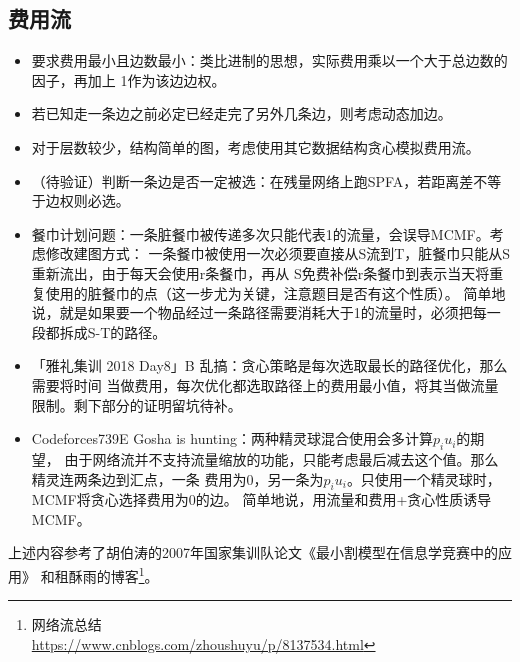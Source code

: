 \subsection{费用流}
\begin{itemize}
    \item 要求费用最小且边数最小：类比进制的思想，实际费用乘以一个大于总边数的因子，再加上
    1作为该边边权。
    \item 若已知走一条边之前必定已经走完了另外几条边，则考虑动态加边。
    \item 对于层数较少，结构简单的图，考虑使用其它数据结构贪心模拟费用流。
    \item （待验证）判断一条边是否一定被选：在残量网络上跑SPFA，若距离差不等于边权则必选。
    \item 餐巾计划问题：一条脏餐巾被传递多次只能代表1的流量，会误导MCMF。考虑修改建图方式：
    一条餐巾被使用一次必须要直接从S流到T，脏餐巾只能从S重新流出，由于每天会使用r条餐巾，再从
    S免费补偿r条餐巾到表示当天将重复使用的脏餐巾的点（这一步尤为关键，注意题目是否有这个性质）。
    简单地说，就是如果要一个物品经过一条路径需要消耗大于1的流量时，必须把每一段都拆成S-T的路径。

    \item 「雅礼集训 2018 Day8」B 乱搞：贪心策略是每次选取最长的路径优化，那么需要将时间
    当做费用，每次优化都选取路径上的费用最小值，将其当做流量限制。剩下部分的证明留坑待补。
    \item Codeforces739E Gosha is hunting：两种精灵球混合使用会多计算$p_iu_i$的期望，
    由于网络流并不支持流量缩放的功能，只能考虑最后减去这个值。那么精灵连两条边到汇点，一条
    费用为0，另一条为$p_iu_i$。只使用一个精灵球时，MCMF将贪心选择费用为0的边。
    简单地说，用流量和费用+贪心性质诱导MCMF。
\end{itemize}

上述内容参考了胡伯涛的2007年国家集训队论文《最小割模型在信息学竞赛中的应用》
\cite{MCIOI}和租酥雨的博客\footnote{
    网络流总结\\
    \url{https://www.cnblogs.com/zhoushuyu/p/8137534.html}
}。
